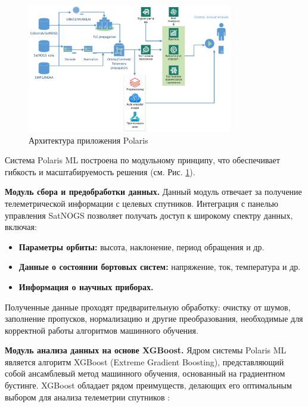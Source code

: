 \documentclass[14pt, a4paper]{../cls/coursework}
\begin{document}
    \begin{figure}[htbp]
        \centering
        \includegraphics[width=0.8\textwidth]{polaris_architecture}
        \caption{Архитектура приложения Polaris}
        \label{fig:polaris_architecture}
    \end{figure}

    Система Polaris ML построена по модульному принципу, что обеспечивает гибкость и масштабируемость решения (см. Рис. \ref{fig:polaris_architecture}).

    \textbf{Модуль сбора и предобработки данных.} Данный модуль отвечает за получение телеметрической информации с целевых спутников.
    Интеграция с панелью управления SatNOGS позволяет получать доступ к широкому спектру данных, включая:
    \begin{itemize}
        \item \textbf{Параметры орбиты:} высота, наклонение, период обращения и др.
        \item \textbf{Данные о состоянии бортовых систем:} напряжение, ток, температура и др.
        \item \textbf{Информация о научных приборах.}
    \end{itemize}

    Полученные данные проходят предварительную обработку: очистку от шумов, заполнение пропусков, нормализацию и другие преобразования, необходимые для корректной работы алгоритмов машинного обучения.

    \textbf{Модуль анализа данных на основе XGBoost.} Ядром системы Polaris ML является алгоритм XGBoost (Extreme Gradient Boosting), представляющий собой ансамблевый метод машинного обучения, основанный на градиентном бустинге.
    XGBoost обладает рядом преимуществ, делающих его оптимальным выбором для анализа телеметрии спутников \cite{luppen2021introducing}:
\end{document}
